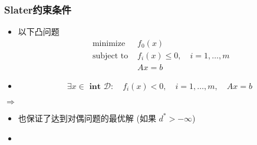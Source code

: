 \documentclass[handout,10pt]{beamer}
\begin{document}
\begin{frame}
	\frametitle{Slater约束条件}

\begin{proposition}
   \begin{itemize}
     \item 以下凸问题
	\begin{equation}
		\begin{array}{ll}
		\text{ minimize } & f_{0}(x) \\
		\text { subject to } & f_{i}(x) \leq 0, \quad i=1, \ldots, m \\
		& A x=b
		\end{array}
	\end{equation}

   \item 	  %
	\begin{equation}
		\exists x \in \textbf { int } \mathcal{D}: \quad f_{i}(x)<0, \quad i=1, \ldots, m, \quad A x=b
	\end{equation}
   \end{itemize}
$\Longrightarrow$ 
\end{proposition}
	
\begin{remark}
  \begin{itemize}%
		\item 也保证了达到对偶问题的最优解 (如果 $d^* > -\infty$)

     \item %

	\end{itemize}

\end{remark}

\end{frame}
\end{document}
